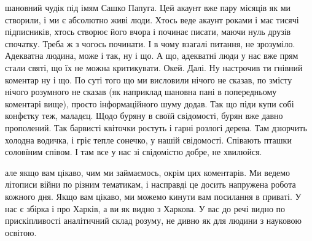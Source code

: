 шановний чудік під імям Сашко Папуга. Цей акаунт вже пару місяців як ми
створили, і ми є абсолютно живі люди. Хтось веде акаунт роками і має тисячі
підписників, хтось створює його вчора і починає писати, маючи нуль друзів
спочатку. Треба ж з чогось починати. І в чому взагалі питання, не зрозуміло.
Адекватна людина, може і так, ну і що. А що, адекватні люди у нас вже прям
стали святі, що їх не можна критикувати. Окей. Далі. Ну настрочив ти гнівний
коментар ну і що. По суті того що ми висловили нічого не сказав, по змісту
нічого розумного не сказав (як наприклад шановна пані в попередньому коментарі
вище), просто інформаційного шуму додав. Так що піди купи собі конфєтку теж,
маладєц. Щодо буряну в своїй свідомості, бурян вже давно прополений. Так
барвисті квіточки ростуть і гарні розлогі дерева. Там дзюрчить холодна водичка,
і гріє тепле сонечко, у нашій свідомості. Співають пташки соловїним співом. І
там все у нас зі свідомістю добре, не хвилюйся.

але якщо вам цікаво, чим ми займаємось, окрім цих коментарів. Ми ведемо
літописи війни по різним тематикам, і насправді це досить напружена робота
кожного дня. Якщо вам цікаво, ми можемо кинути вам посилання в приваті. У нас є
збірка і про Харків, а ви як видно з Харкова. У вас до речі видно по
прискіпливості аналітичний склад розуму, не дивно як для людини з науковою
освітою.
